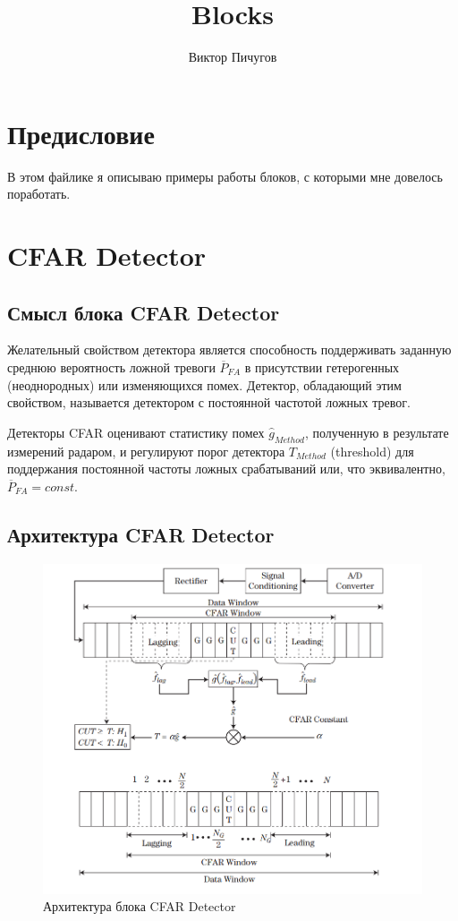 \documentclass[a4paper,11pt]{article}
\title{Blocks}
\author{Виктор Пичугов}
\begin{document}
 
	\maketitle
	\tableofcontents
	\newpage

	
	\section{Предисловие}
		В этом файлике я описываю примеры работы блоков, с которыми мне довелось поработать.
	
	\section{CFAR Detector}
	\subsection{Смысл блока CFAR Detector}
	Желательный свойством детектора является способность поддерживать заданную среднюю вероятность ложной тревоги $\overline{P}_{FA}$ в присутствии гетерогенных (неоднородных) или изменяющихся помех. Детектор, обладающий этим свойством, называется детектором с постоянной частотой ложных тревог. 
	
	Детекторы CFAR оценивают статистику помех $\widehat{g}_{Method}$, полученную в результате измерений радаром, и регулируют порог детектора $T_{Method}$ (threshold) для поддержания постоянной частоты ложных срабатываний или, что эквивалентно, $\overline{P}_{FA} = const$.
 	
 	\subsection{Архитектура CFAR Detector}
 	\begin{figure}[h!]
 		
 		\centering
 		
 		\includegraphics[width=0.6\linewidth]{Architecture.png}
 		
 		\caption{Архитектура блока CFAR Detector}
 		
 		
 	\end{figure}
 	
\end{document}
